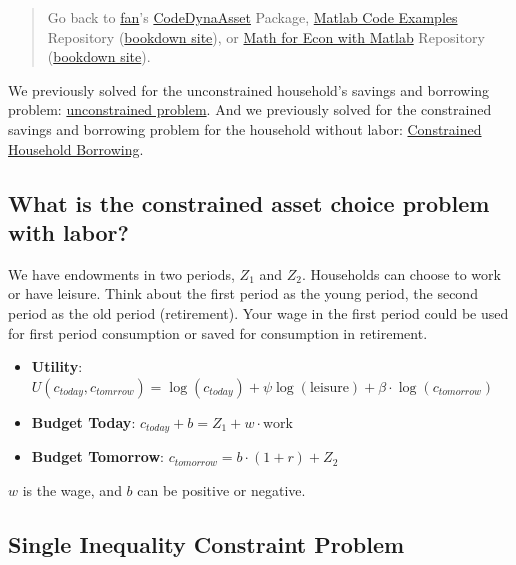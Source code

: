 \documentclass[
]{book}
\begin{document}
\begin{quote}
Go back to \href{http://fanwangecon.github.io/}{fan}'s \href{https://fanwangecon.github.io/CodeDynaAsset/}{CodeDynaAsset} Package, \href{https://fanwangecon.github.io/M4Econ/}{Matlab Code Examples} Repository (\href{https://fanwangecon.github.io/M4Econ/bookdown}{bookdown site}), or \href{https://fanwangecon.github.io/Math4Econ/}{Math for Econ with Matlab} Repository (\href{https://fanwangecon.github.io/Math4Econ/bookdown}{bookdown site}).
\end{quote}

We previously solved for the unconstrained household's savings and
borrowing problem: \href{https://fanwangecon.github.io/Math4Econ/derivative_application/K_save_households.html}{unconstrained
problem}.
And we previously solved for the constrained savings and borrowing
problem for the household without labor: \href{https://fanwangecon.github.io/Math4Econ/opti_hh_constrained_brsv/household_borrow_constrained.html}{Constrained Household
Borrowing}.

\hypertarget{what-is-the-constrained-asset-choice-problem-with-labor}{%
\subsection{What is the constrained asset choice problem with labor?}\label{what-is-the-constrained-asset-choice-problem-with-labor}}

We have endowments in two periods, \(Z_1\) and \(Z_2\). Households can
choose to work or have leisure. Think about the first period as the
young period, the second period as the old period (retirement). Your
wage in the first period could be used for first period consumption or
saved for consumption in retirement.

\begin{itemize}
\item
  \textbf{Utility}:
  \(U(c_{today} ,c_{tomrrow} )=\log (c_{today} )+\psi \log (\textrm{leisure})+\beta \cdot \log (c_{tomorrow} )\)
\item
  \textbf{Budget Today}: \(c_{today} +b=Z_1 +w\cdot \textrm{work}\)
\item
  \textbf{Budget Tomorrow}: \(c_{tomorrow} =b\cdot (1+r)+Z_2\)
\end{itemize}

\(w\) is the wage, and \(b\) can be positive or negative.

\hypertarget{single-inequality-constraint-problem}{%
\subsection{Single Inequality Constraint Problem}\label{single-inequality-constraint-problem}}
\end{document}
